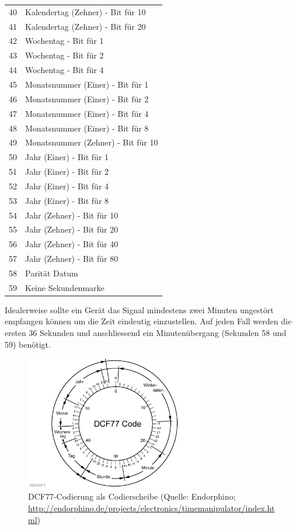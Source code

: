 \begin{longtable}{p{0.5cm} p{13.5cm}}
40 & Kalendertag (Zehner) - Bit für 10 \\
41 & Kalendertag (Zehner) - Bit für 20 \\
42 & Wochentag - Bit für 1 \\
43 & Wochentag - Bit für 2 \\
44 & Wochentag - Bit für 4 \\
45 & Monatsnummer (Einer) - Bit für 1 \\
46 & Monatsnummer (Einer) - Bit für 2 \\
47 & Monatsnummer (Einer) - Bit für 4 \\
48 & Monatsnummer (Einer) - Bit für 8 \\
49 & Monatsnummer (Zehner) - Bit für 10 \\
50 & Jahr (Einer) - Bit für 1 \\
51 & Jahr (Einer) - Bit für 2 \\
52 & Jahr (Einer) - Bit für 4 \\
53 & Jahr (Einer) - Bit für 8 \\
54 & Jahr (Zehner) - Bit für 10 \\
55 & Jahr (Zehner) - Bit für 20 \\
56 & Jahr (Zehner) - Bit für 40 \\
57 & Jahr (Zehner) - Bit für 80 \\
58 & Parität Datum \\
59 & Keine Sekundenmarke
\end{longtable}

Idealerweise sollte ein Gerät das Signal mindestens zwei Minuten ungestört empfangen können um die Zeit eindeutig einzustellen. Auf jeden Fall werden die ersten 36 Sekunden und anschliessend ein Minutenübergang (Sekunden 58 und 59) benötigt.

\begin{figure}
  \begin{center}
    \includegraphics[width=0.7\textwidth]{./images/Analyse/DCF77_Codierscheibe.png}
  \end{center}
  \caption[DCF77-Codierung als Codierscheibe]{DCF77-Codierung als Codierscheibe (Quelle: Endorphino; 
  \url{http://endorphino.de/projects/electronics/timemanipulator/index.html})} 
\end{figure}

